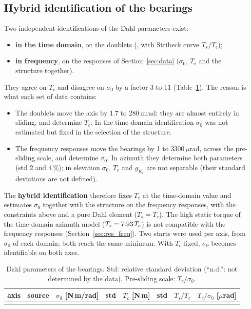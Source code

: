 \documentclass[10pt,a4paper]{article}
\numberwithin{equation}{section}
\begin{document}
\subsection{Hybrid identification of the bearings}
Two independent identifications of the Dahl parameters exist:
\begin{itemize}
\item \textbf{in the time domain}, on the doublets (, with Stribeck curve $T_s/T_c$);
\item \textbf{in frequency}, on the responses of Section~\ref{sec:data} ($\sigma_0$, $T_c$ and the structure together).
\end{itemize}
They agree on $T_c$ and disagree on $\sigma_0$ by a factor 3 to 11 (Table~\ref{tab:friction}). The reason is what each set of data contains:
\begin{itemize}
\item The doublets move the axis by 1.7 to 280\,mrad: they are almost entirely in sliding, and determine $T_c$. In the time-domain identification $\sigma_0$ was not estimated but fixed in the selection of the structure.
\item The frequency responses move the bearings by 1 to 3300\,$\mu$rad, across the pre-sliding scale, and determine $\sigma_0$. In azimuth they determine both parameters (std 2 and 4\,\%); in elevation $\sigma_0$, $T_c$ and $g_{K_t}$ are not separable (their standard deviations are not defined).
\end{itemize}
The \textbf{hybrid identification} therefore fixes $T_c$ at the time-domain value and estimates $\sigma_0$ together with the structure on the frequency responses, with the constraints above and a pure Dahl element ($T_s=T_c$). The high static torque of the time-domain azimuth model ($T_s=7.93\,T_c$) is not compatible with the frequency responses (Section~\ref{sec:res_freq}). Two starts were used per axis, from $\sigma_0$ of each domain; both reach the same minimum. With $T_c$ fixed, $\sigma_0$ becomes identifiable on both axes.

\begin{table}[H]\centering\footnotesize\setlength{\tabcolsep}{4pt}
\caption{Dahl parameters of the bearings. Std: relative standard deviation (``n.d.'': not determined by the data). Pre-sliding scale: $T_c/\sigma_0$.}\label{tab:friction}
\begin{tabular}{llrrrrrr}\toprule
axis & source & $\sigma_0$ [N\,m/rad] & std & $T_c$ [N\,m] & std & $T_s/T_c$ & $T_c/\sigma_0$ [$\mu$rad] \\ \midrule
\\ \bottomrule
\end{tabular}\end{table}
\end{document}
